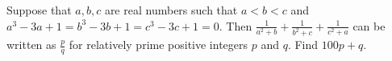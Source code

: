 Suppose that $a,b,c$ are real numbers such that $a < b < c$ and $a^3-3a+1=b^3-3b+1=c^3-3c+1=0$. Then $\frac1{a^2+b}+\frac1{b^2+c}+\frac1{c^2+a}$ can be written as $\frac pq$ for relatively prime positive integers $p$ and $q$. Find $100p+q$.
